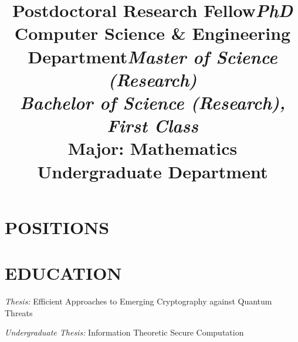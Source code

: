 \documentclass[margin]{res}
\begin{document}
\begin{resume}

\section{POSITIONS}


\title{Postdoctoral Research Fellow}
\begin{position}

\end{position}



\section{EDUCATION}

\title{{\sl PhD}\\ Computer Science \& Engineering Department}
\begin{position}
\textit{Thesis:} Eﬃcient Approaches to Emerging Cryptography
against Quantum Threats
\end{position}


\title{{\sl Master of Science (Research)}\\ {\sl Bachelor of Science (Research), First Class}\\ Major: Mathematics\\ Undergraduate Department}
\begin{position}
\textit{Undergraduate Thesis:} Information Theoretic Secure Computation
\end{position}


\end{resume}
\end{document}
